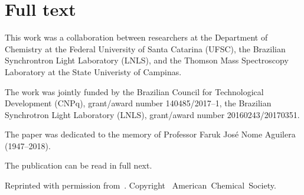\section{Full text}

This work was a collaboration between researchers
at the Department of Chemistry at the Federal University of Santa Catarina (UFSC),
the Brazilian Synchrontron Light Laboratory (LNLS),
and the Thomson Mass Spectroscopy Laboratory at the State Univeristy of Campinas.

The work was jointly funded by the Brazilian Council for Technological Development (CNPq),
grant/award number 140485/2017--1,
the Brazilian Synchrotron Light Laboratory (LNLS),
grant/award number 20160243/20170351.

The paper was dedicated to the memory of Professor Faruk José Nome Aguilera (1947--2018).

The publication can be read in full next.

Reprinted with permission from~.
Copyright~\citeyear{Coelho_2019}
American~Chemical~Society.


